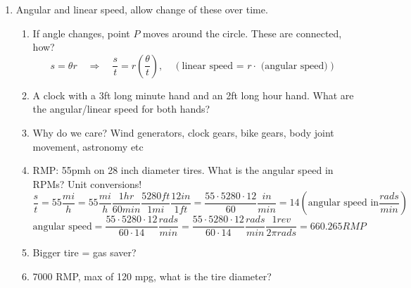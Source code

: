 \documentclass{article}
\begin{document}
\begin{enumerate}
\item Angular and linear speed, allow change of these over time.
\begin{enumerate}
\item If angle changes, point $P$ moves around the circle. These are connected, how?
\[
s = \theta r \quad\Rightarrow\quad \frac{s}{t} = r \left(\frac{\theta}{t}\right), \quad (\text{linear speed = $r \cdot$ (angular speed)})
\]
\item A clock with a 3ft long minute hand and an 2ft long hour hand. What are the angular/linear speed for both hands?
\item Why do we care? Wind generators, clock gears, bike gears, body joint movement, astronomy etc
\item RMP: 55pmh on 28 inch diameter tires. What is the angular speed in RPMs? Unit conversions!
\[
\frac{s}{t} = 55 \frac{mi}{h} = 55 \frac{mi}{h} \frac{1 hr}{60 min} \frac{5280 ft}{1 mi} \frac{12 in}{1 ft} 
= \frac{55\cdot 5280 \cdot 12}{60} \frac{in}{min} = 14 \left(\text{angular speed in} \frac{rads}{min}\right)
\]
\[
\text{angular speed} = \frac{55\cdot 5280 \cdot 12}{60 \cdot 14} \frac{rads}{min} = \frac{55\cdot 5280 \cdot 12}{60 \cdot 14} \frac{rads}{min} \frac{1 rev}{2\pi rads} =  660.265 RMP
\]
\item Bigger tire = gas saver?
\item 7000 RMP, max of 120 mpg, what is the tire diameter?
\end{enumerate}
\end{enumerate}


\end{document}
